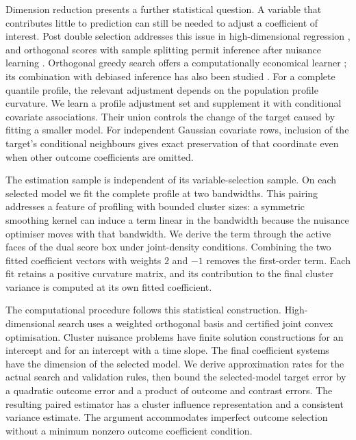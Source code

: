 Dimension reduction presents a further statistical question. A variable
that contributes little to prediction can still be needed to adjust a
coefficient of interest. Post double selection addresses this issue in
high-dimensional regression \cite{belloni2014}, and orthogonal scores
with sample splitting permit inference after nuisance learning
\cite{ning2017,chernozhukov2018}. Orthogonal greedy search offers a
computationally economical learner \cite{ing2011}; its combination with
debiased inference has also been studied \cite{cha2022}. For a complete
quantile profile, the relevant adjustment depends on the population
profile curvature. We learn a profile adjustment set and supplement it
with conditional covariate associations. Their union controls the
change of the target caused by fitting a smaller model. For independent
Gaussian covariate rows, inclusion of the target's conditional
neighbours gives exact preservation of that coordinate even when other
outcome coefficients are omitted.

The estimation sample is independent of its variable-selection sample.
On each selected model we fit the complete profile at two bandwidths.
This pairing addresses a feature of profiling with bounded cluster
sizes: a symmetric smoothing kernel can induce a term linear in the
bandwidth because the nuisance optimiser moves with that bandwidth.
We derive the term through the active faces of the dual score box under
joint-density conditions. Combining the two fitted coefficient vectors
with weights $2$ and $-1$ removes the first-order term. Each fit retains
a positive curvature matrix, and its contribution to the final cluster
variance is computed at its own fitted coefficient.

The computational procedure follows this statistical construction.
High-dimensional search uses a weighted orthogonal basis and certified
joint convex optimisation. Cluster nuisance problems have finite
solution constructions for an intercept and for an intercept with a
time slope. The final coefficient systems have the dimension of the
selected model. We derive approximation rates for the actual search
and validation rules, then bound the selected-model target error by a
quadratic outcome error and a product of outcome and contrast errors.
The resulting paired estimator has a cluster influence representation
and a consistent variance estimate. The argument accommodates
imperfect outcome selection without a minimum nonzero outcome
coefficient condition.

